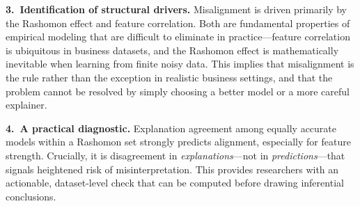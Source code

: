 \documentclass[11pt]{article}
\begin{document}
\noindent\textbf{3.\ Identification of structural drivers.} Misalignment is driven primarily by the Rashomon effect and feature correlation. Both are fundamental properties of empirical modeling \citep{paes23inevitable} that are difficult to eliminate in practice---feature correlation is ubiquitous in business datasets, and the Rashomon effect is mathematically inevitable when learning from finite noisy data. This implies that misalignment is the rule rather than the exception in realistic business settings, and that the problem cannot be resolved by simply choosing a better model or a more careful explainer.

\noindent\textbf{4.\ A practical diagnostic.} Explanation agreement among equally accurate models within a Rashomon set strongly predicts alignment, especially for feature strength. Crucially, it is disagreement in \emph{explanations}---not in \emph{predictions}---that signals heightened risk of misinterpretation. This provides researchers with an actionable, dataset-level check that can be computed before drawing inferential conclusions.
\vspace{-0.5cm}
\end{document}
